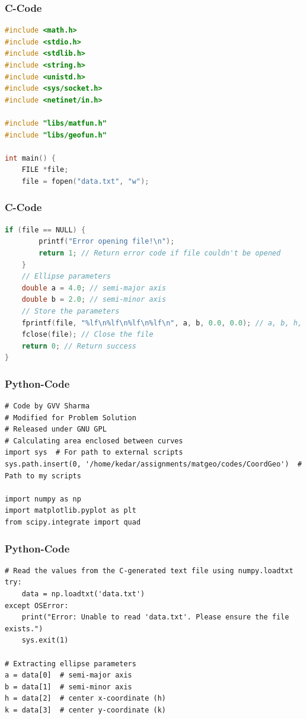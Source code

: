 \documentclass{beamer}
\begin{document}
\begin{frame}[fragile]
\frametitle{C-Code}
\begin{lstlisting}[language=C]
#include <math.h>
#include <stdio.h>
#include <stdlib.h>
#include <string.h>
#include <unistd.h>
#include <sys/socket.h>
#include <netinet/in.h>

#include "libs/matfun.h"
#include "libs/geofun.h"

int main() {
    FILE *file;
    file = fopen("data.txt", "w");
\end{lstlisting}
\end{frame}
\begin{frame}[fragile]
\frametitle{C-Code}
    \begin{lstlisting}[language=C]
            if (file == NULL) {
        printf("Error opening file!\n");
        return 1; // Return error code if file couldn't be opened
    }
    // Ellipse parameters
    double a = 4.0; // semi-major axis
    double b = 2.0; // semi-minor axis
    // Store the parameters
    fprintf(file, "%lf\n%lf\n%lf\n%lf\n", a, b, 0.0, 0.0); // a, b, h, k
    fclose(file); // Close the file
    return 0; // Return success
}
    \end{lstlisting}
\end{frame}
\begin{frame}[fragile]
\frametitle{Python-Code}
\begin{lstlisting}
# Code by GVV Sharma
# Modified for Problem Solution
# Released under GNU GPL
# Calculating area enclosed between curves
import sys  # For path to external scripts
sys.path.insert(0, '/home/kedar/assignments/matgeo/codes/CoordGeo')  # Path to my scripts

import numpy as np
import matplotlib.pyplot as plt
from scipy.integrate import quad
\end{lstlisting}
\end{frame}

\begin{frame}[fragile]
\frametitle{Python-Code}
\begin{lstlisting}
# Read the values from the C-generated text file using numpy.loadtxt
try:
    data = np.loadtxt('data.txt')
except OSError:
    print("Error: Unable to read 'data.txt'. Please ensure the file exists.")
    sys.exit(1)

# Extracting ellipse parameters
a = data[0]  # semi-major axis
b = data[1]  # semi-minor axis
h = data[2]  # center x-coordinate (h)
k = data[3]  # center y-coordinate (k)
\end{lstlisting}
\end{frame}
\end{document}
